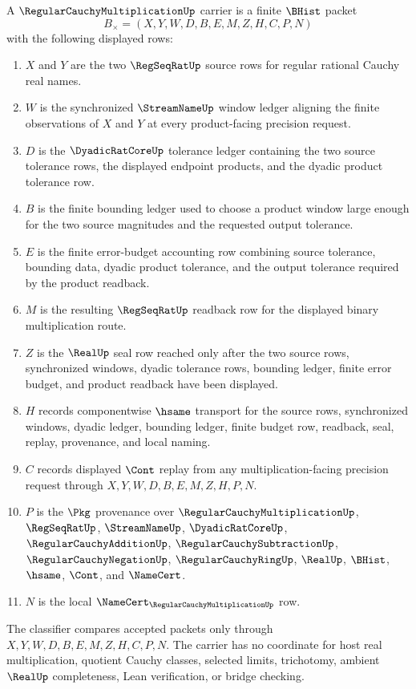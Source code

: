 \begin{definition}
\label{def:regular-cauchy-multiplication-carrier}
A $\RegularCauchyMultiplicationUp$ carrier is a finite $\BHist$ packet
$$
B_\times=(X,Y,W,D,B,E,M,Z,H,C,P,N)
$$
with the following displayed rows:
\begin{enumerate}
\item $X$ and $Y$ are the two $\RegSeqRatUp$ source rows for regular rational Cauchy real names.
\item $W$ is the synchronized $\StreamNameUp$ window ledger aligning the finite observations of $X$ and $Y$ at every product-facing precision request.
\item $D$ is the $\DyadicRatCoreUp$ tolerance ledger containing the two source tolerance rows, the displayed endpoint products, and the dyadic product tolerance row.
\item $B$ is the finite bounding ledger used to choose a product window large enough for the two source magnitudes and the requested output tolerance.
\item $E$ is the finite error-budget accounting row combining source tolerance, bounding data, dyadic product tolerance, and the output tolerance required by the product readback.
\item $M$ is the resulting $\RegSeqRatUp$ readback row for the displayed binary multiplication route.
\item $Z$ is the $\RealUp$ seal row reached only after the two source rows, synchronized windows, dyadic tolerance rows, bounding ledger, finite error budget, and product readback have been displayed.
\item $H$ records componentwise $\hsame$ transport for the source rows, synchronized windows, dyadic ledger, bounding ledger, finite budget row, readback, seal, replay, provenance, and local naming.
\item $C$ records displayed $\Cont$ replay from any multiplication-facing precision request through $X,Y,W,D,B,E,M,Z,H,P,N$.
\item $P$ is the $\Pkg$ provenance over $\RegularCauchyMultiplicationUp$, $\RegSeqRatUp$, $\StreamNameUp$, $\DyadicRatCoreUp$, $\RegularCauchyAdditionUp$, $\RegularCauchySubtractionUp$, $\RegularCauchyNegationUp$, $\RegularCauchyRingUp$, $\RealUp$, $\BHist$, $\hsame$, $\Cont$, and $\NameCert$.
\item $N$ is the local $\NameCert_{\RegularCauchyMultiplicationUp}$ row.
\end{enumerate}
The classifier compares accepted packets only through $X,Y,W,D,B,E,M,Z,H,C,P,N$. The carrier has no coordinate for host real multiplication, quotient Cauchy classes, selected limits, trichotomy, ambient $\RealUp$ completeness, Lean verification, or bridge checking.
\end{definition}

